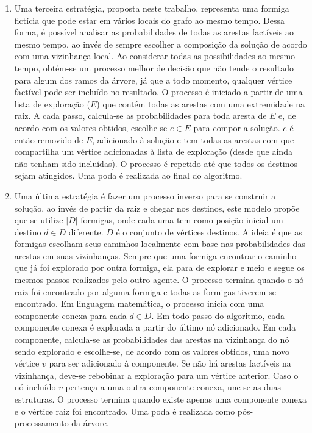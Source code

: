 \begin{enumerate}
	\item Uma terceira estratégia, proposta neste trabalho, representa uma formiga fictícia que pode estar em vários locais do grafo ao mesmo tempo. Dessa forma, é possível analisar as probabilidades de todas as arestas factíveis ao mesmo tempo, ao invés de sempre escolher a composição da solução de acordo com uma vizinhança local. Ao considerar todas as possibilidades ao mesmo tempo, obtém-se um processo melhor de decisão que não tende o resultado para algum dos ramos da árvore, já que a todo momento, qualquer vértice factível pode ser incluído no resultado. O processo é iniciado a partir de uma lista de exploração ($E$) que contém todas as arestas com uma extremidade na raiz. A cada passo, calcula-se as probabilidades para toda aresta de $E$ e, de acordo com os valores obtidos, escolhe-se $e \in E$ para compor a solução. $e$ é então removido de $E$, adicionado à solução e tem todas as arestas com que compartilha um vértice adicionadas à lista de exploração (desde que ainda não tenham sido incluídas). O processo é repetido até que todos os destinos sejam atingidos. Uma poda é realizada ao final do algoritmo.
	\item Uma última estratégia é fazer um processo inverso para se construir a solução, ao invés de partir da raiz e chegar nos destinos, este modelo propõe que se utilize $|D|$ formigas, onde cada uma tem como posição inicial um destino $d \in D$ diferente. $D$ é o conjunto de vértices destinos. A ideia é que as formigas escolham seus caminhos localmente com base nas probabilidades das arestas em suas vizinhanças. Sempre que uma formiga encontrar o caminho que já foi explorado por outra formiga, ela para de explorar e meio e segue os mesmos passos realizados pelo outro agente. O processo termina quando o nó raiz foi encontrado por alguma formiga e todas as formigas tiverem se encontrado. Em linguagem matemática, o processo inicia com uma componente conexa para cada $d \in D$. Em todo passo do algoritmo, cada componente conexa é explorada a partir do último nó adicionado. Em cada componente, calcula-se as probabilidades das arestas na vizinhança do nó sendo explorado e escolhe-se, de acordo com os valores obtidos, uma novo vértice $v$ para ser adicionado à componente. Se não há arestas factíveis na vizinhança, deve-se rebobinar a exploração para um vértice anterior. Caso o nó incluído $v$ pertença a uma outra componente conexa, une-se as duas estruturas. O processo termina quando existe apenas uma componente conexa e o vértice raiz foi encontrado. Uma poda é realizada como pós-processamento da árvore. 
\end{enumerate}

